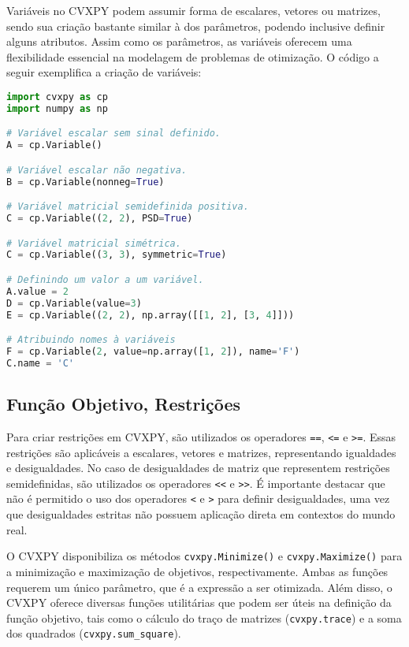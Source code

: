 Variáveis no CVXPY podem assumir forma de escalares, vetores ou matrizes, sendo sua criação bastante similar à dos parâmetros, podendo inclusive definir alguns atributos. Assim como os parâmetros, as variáveis oferecem uma flexibilidade essencial na modelagem de problemas de otimização. O código a seguir exemplifica a criação de variáveis:

\vspace{8pt}
\begin{lstlisting}[language=Python, caption={Criação de variáveis usando CVXPY.}]
import cvxpy as cp
import numpy as np

# Variável escalar sem sinal definido.
A = cp.Variable()

# Variável escalar não negativa.
B = cp.Variable(nonneg=True)

# Variável matricial semidefinida positiva.
C = cp.Variable((2, 2), PSD=True)

# Variável matricial simétrica.
C = cp.Variable((3, 3), symmetric=True)

# Definindo um valor a um variável.
A.value = 2
D = cp.Variable(value=3)
E = cp.Variable((2, 2), np.array([[1, 2], [3, 4]]))

# Atribuindo nomes à variáveis 
F = cp.Variable(2, value=np.array([1, 2]), name='F')
C.name = 'C'
\end{lstlisting}

\subsection{Função Objetivo, Restrições}

Para criar restrições em CVXPY, são utilizados os operadores \texttt{==}, \texttt{<=} e \texttt{>=}. Essas restrições são aplicáveis a escalares, vetores e matrizes, representando igualdades e desigualdades. No caso de desigualdades de matriz que representem restrições semidefinidas, são utilizados os operadores \texttt{<<} e \texttt{>>}. É importante destacar que não é permitido o uso dos operadores \texttt{<} e \texttt{>} para definir desigualdades, uma vez que desigualdades estritas não possuem aplicação direta em contextos do mundo real.

O CVXPY disponibiliza os métodos \texttt{cvxpy.Minimize()} e \texttt{cvxpy.Maximize()} para a minimização e maximização de objetivos, respectivamente. Ambas as funções requerem um único parâmetro, que é a expressão a ser otimizada. Além disso, o CVXPY oferece diversas funções utilitárias que podem ser úteis na definição da função objetivo, tais como o cálculo do traço de matrizes (\texttt{cvxpy.trace}) e a soma dos quadrados (\texttt{cvxpy.sum\_square}).

